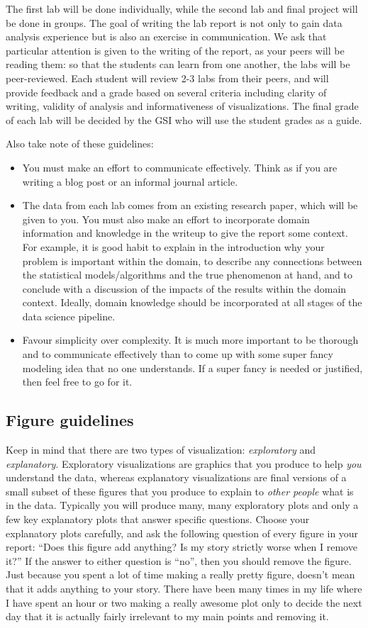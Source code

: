 \documentclass[letterpaper,12pt]{article}
\begin{document}
The first lab will be done individually, while the second lab and final project will be done in groups. The goal of writing the lab report is not only to gain data analysis
experience but is also an exercise in communication. We ask that particular attention is given to
the writing of the report, as your peers will be reading them: so that the students can learn from
one another, the labs will be peer-reviewed. Each student will review 2-3 labs from their peers, and
will provide feedback and a grade based on several criteria including clarity of writing, validity of
analysis and informativeness of visualizations. The final grade of each lab will be decided by the
GSI who will use the student grades as a guide.

Also take note of these guidelines:
\begin{itemize}
    \item You must make an effort to communicate effectively. Think as if you are writing a blog post or an informal journal article.
    \item The data from each lab comes from an existing research paper, which will be given to you. You must also make an effort to incorporate domain information and knowledge in the writeup to give the report some context. For example, it is good habit to explain in the introduction why your problem is important within the domain, to describe any connections between the statistical models/algorithms and the true phenomenon at hand, and to conclude with a discussion of the impacts of the results within the domain context. Ideally, domain knowledge should be incorporated at all stages of the data science pipeline.
    \item Favour simplicity over complexity. It is much more important to be thorough and to communicate effectively than to come up with some super fancy modeling idea that no one understands. If a super fancy is needed or justified, then feel free to go for it.
\end{itemize}

\subsection{Figure guidelines}
Keep in mind that there are two types of visualization: \textit{exploratory} and \textit{explanatory}. Exploratory visualizations are graphics that you produce to help \textit{you} understand the data, whereas explanatory visualizations are final versions of a small subset of these figures that you produce to explain to \textit{other people} what is in the data. Typically you will produce many, many exploratory plots and only a few key explanatory plots that answer specific questions. Choose your explanatory plots carefully, and ask the following question of every figure in your report: ``Does this figure add anything? Is my story strictly worse when I remove it?'' If the answer to either question is ``no'', then you should remove the figure. Just because you spent a lot of time making a really pretty figure, doesn't mean that it adds anything to your story. There have been many times in my life where I have spent an hour or two making a really awesome plot only to decide the next day that it is actually fairly irrelevant to my main points and removing it.
\end{document}

